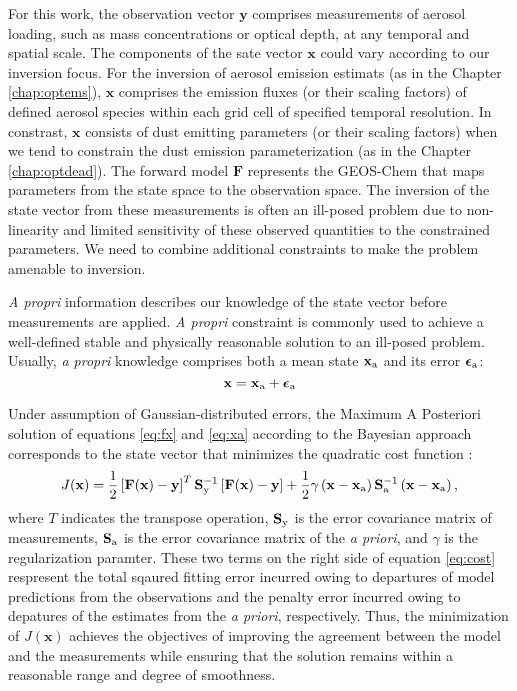  For this work, the observation 
 vector $\mathbf{y}$ comprises measurements of 
 aerosol loading, such as mass concentrations or optical depth, at any temporal 
 and spatial scale. The components of the sate vector $\mathbf{x}$ could vary 
 according to our inversion focus. For the inversion of aerosol emission estimats 
 (as in the Chapter \ref{chap:optems}), 
 $\mathbf{x}$ comprises the emission fluxes (or their scaling factors) of defined 
 aerosol species within each grid cell of specified temporal resolution. 
 In constrast, $\mathbf{x}$ consists of 
 dust emitting parameters (or their scaling factors) when we tend to constrain 
 the dust emission parameterization (as in the Chapter \ref{chap:optdead}). 
 The forward model $\mathbf{F}$ 
 represents the GEOS-Chem that maps parameters from the state space to the 
 observation space. The inversion of the state vector from these measurements is often 
 an ill-posed problem due to non-linearity and limited sensitivity of these observed 
 quantities to the constrained parameters. We need to combine additional constraints 
 to make the problem amenable to inversion. 

 \textit{A propri} information describes our knowledge of the state vector before measurements
 are applied. \textit{A propri} constraint is commonly used to achieve a well-defined stable
 and physically reasonable solution to an ill-posed problem. Usually, \textit{a propri} 
 knowledge comprises both a mean state $\mathbf{x}_\text{a}$ and its error
 $\boldsymbol{\epsilon}_\text{a}$:
 \begin{equation} \label{eq:xa}
  \mathbf{x} = \mathbf{x}_\text{a} + \boldsymbol{\epsilon}_\text{a}
 \end{equation} 

 Under assumption of Gaussian-distributed errors, the Maximum A Posteriori solution of
  equations \eqref{eq:fx} and \eqref{eq:xa} according to the Bayesian approach
 corresponds to the state vector that minimizes the quadratic cost function 
 \citep{rodgers00}: 
 \begin{equation} \label{eq:cost}
 J(\mathbf{x}) = \frac{1}{2} \left[ \mathbf{F(x)-y}\right]^T
                 \mathbf{S}_\text{y}^{-1} \left[ \mathbf{F(x)-y}\right]
               + \frac{1}{2} \gamma \left( \mathbf{x}-\mathbf{x}_\text{a} \right)
                 \mathbf{S}_\text{a}^{-1} \left( \mathbf{x}-\mathbf{x}_\text{a} \right) \mbox{,}
 \end{equation}
 where $T$ indicates the transpose operation, $\mathbf{S}_\text{y}$ is the error covariance matrix 
 of measurements, $\mathbf{S}_\text{a}$ is the error covariance matrix of the \textit{a priori}, 
 and $\gamma$ is the regularization paramter. These two terms on the right side of 
 equation \eqref{eq:cost} respresent the total sqaured fitting error incurred owing 
 to departures of model predictions from the observations and the penalty error
 incurred owing to depatures of the estimates from the \textit{a priori}, respectively.
 Thus, the minimization of $J(\mathbf{x})$ achieves the objectives of improving the 
 agreement between the model and the measurements while ensuring that the solution 
 remains within a reasonable range and degree of smoothness. 

